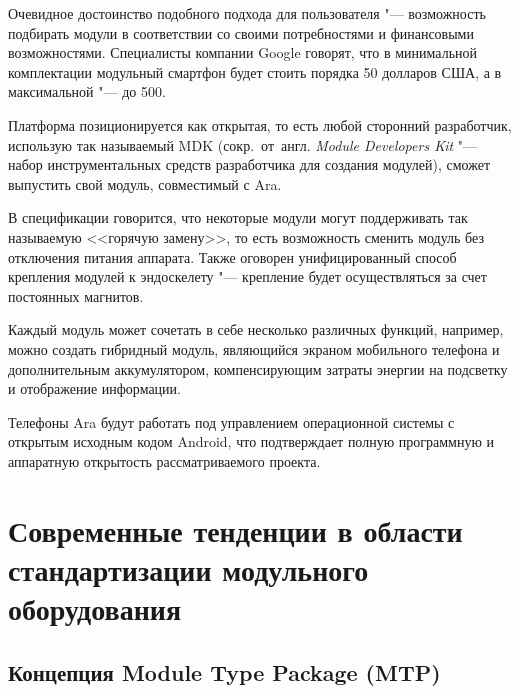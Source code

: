 Очевидное достоинство подобного подхода для пользователя "--- возможность подбирать модули в соответствии со своими потребностями и финансовыми возможностями. Специалисты компании Google говорят, что в минимальной комплектации модульный смартфон будет стоить порядка 50 долларов США, а в максимальной "--- до 500.

Платформа позиционируется как открытая, то есть любой сторонний разработчик, использую так называемый MDK (сокр.~от~англ. \textit{Module Developers Kit} "--- набор инструментальных средств разработчика для создания модулей), сможет выпустить свой модуль, совместимый с Ara.

В спецификации говорится, что некоторые модули могут поддерживать так называемую <<горячую замену>>, то есть возможность сменить модуль без отключения питания аппарата. Также оговорен унифицированный способ крепления модулей к эндоскелету "--- крепление будет осуществляться за счет постоянных магнитов.

Каждый модуль может сочетать в себе несколько различных функций, например, можно создать гибридный модуль, являющийся экраном мобильного телефона и дополнительным аккумулятором, компенсирующим затраты энергии на подсветку и отображение информации.

Телефоны Ara будут работать под управлением операционной системы с открытым исходным кодом Android, что подтверждает полную программную и аппаратную открытость рассматриваемого проекта.

\section{Современные тенденции в области стандартизации модульного оборудования}

\subsection{Концепция Module Type Package (MTP)}

